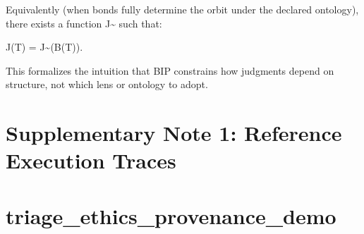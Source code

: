 \documentclass[12pt]{article}
\theoremstyle{plain}
\theoremstyle{definition}
\theoremstyle{remark}
\begin{document}
Equivalently (when bonds fully determine the orbit under the declared
ontology), there exists a function J\textasciitilde{} such that:

J(T) = J\textasciitilde(B(T)).

This formalizes the intuition that BIP constrains how judgments depend
on structure, not which lens or ontology to adopt.

\section{Supplementary Note 1: Reference Execution
Traces}\label{supplementary-note-1-reference-execution-traces}

\section{triage\_ethics\_provenance\_demo}\label{triage_ethics_provenance_demo}
\end{document}
